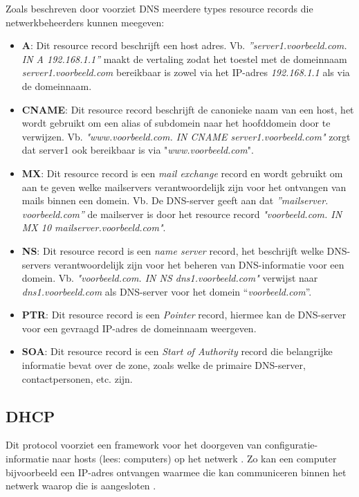 Zoals beschreven door \textcite{Mockapetris1987} voorziet DNS meerdere types resource records die netwerkbeheerders kunnen meegeven: 
\begin{itemize}
    \item \textbf{A}: Dit resource record beschrijft een host adres. 
    Vb. \textit{”server1.voorbeeld.com. IN A 192.168.1.1”} maakt de vertaling zodat het toestel met de domeinnaam \textit{server1.voorbeeld.com} bereikbaar is zowel via het IP-adres \textit{192.168.1.1} als via de domeinnaam. 
    \item \textbf{CNAME}: Dit resource record beschrijft de canonieke naam van een host, het wordt gebruikt om een alias of subdomein naar het hoofddomein door te verwijzen. Vb. \textit{"www.voorbeeld.com. IN CNAME server1.voorbeeld.com"} zorgt dat server1 ook bereikbaar is via "\textit{www.voorbeeld.com}".
    \item \textbf{MX}: Dit resource record is een \textit{mail exchange} record en wordt gebruikt om aan te geven welke mailservers verantwoordelijk zijn voor het ontvangen van mails binnen een domein. Vb. De DNS-server geeft aan dat \textit{”mailserver.\\voorbeeld.com”} de mailserver is door het resource record \textit{"voorbeeld.com. IN MX 10 mailserver.voorbeeld.com"}.
    \item \textbf{NS}: Dit resource record is een \textit{name server} record, het beschrijft welke DNS-servers verantwoordelijk zijn voor het beheren van DNS-informatie voor een domein. Vb. \textit{"voorbeeld.com. IN NS dns1.voorbeeld.com"} verwijst naar \textit{dns1.voorbeeld.com} als DNS-server voor het domein “\textit{voorbeeld.com}”.
    \item \textbf{PTR}: Dit resource record is een \textit{Pointer} record, hiermee kan de DNS-server voor een gevraagd IP-adres de domeinnaam weergeven.
    \item \textbf{SOA}: Dit resource record is een \textit{Start of Authority} record die belangrijke informatie bevat over de zone, zoals welke de primaire DNS-server, contactpersonen, etc. zijn.
\end{itemize}

\subsection{DHCP}
Dit protocol voorziet een framework voor het doorgeven van configuratie-informatie naar hosts (lees: computers) op het netwerk . Zo kan een computer bijvoorbeeld een IP-adres ontvangen waarmee die kan communiceren binnen het netwerk waarop die is aangesloten \autocite{Droms1997}.

